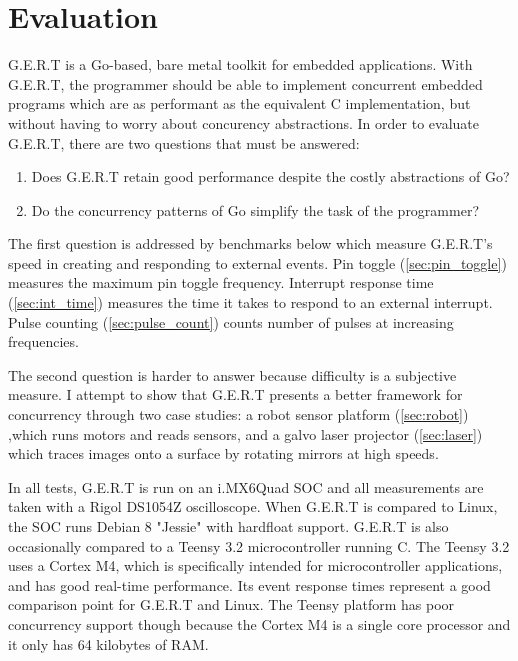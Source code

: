 \chapter{Evaluation}

G.E.R.T is a Go-based, bare metal toolkit for embedded applications.
With G.E.R.T, the programmer should be able to implement concurrent embedded programs
which are as performant as the equivalent C implementation, but without having to
worry about concurency abstractions. In order to evaluate G.E.R.T, there are two questions
that must be answered:

\begin{enumerate}
  \item Does G.E.R.T retain good performance despite the costly abstractions of Go?
  \item Do the concurrency patterns of Go simplify the task of the programmer?
\end{enumerate}

The first question is addressed by benchmarks below which measure G.E.R.T's
speed in creating and responding to external events. Pin toggle (\ref{sec:pin_toggle})
measures the maximum pin toggle frequency. Interrupt response time (\ref{sec:int_time})
measures the time it takes to respond to an external interrupt. Pulse counting
(\ref{sec:pulse_count}) counts number of pulses at increasing frequencies.

The second question is harder to answer because difficulty is a subjective
measure. I attempt to show that G.E.R.T presents a better framework for
concurrency through two case studies: a robot sensor platform (\ref{sec:robot})
,which runs motors and reads sensors, and a galvo laser projector (\ref{sec:laser})
which traces images onto a surface by rotating mirrors at high speeds.

In all tests, G.E.R.T is run on an i.MX6Quad SOC and all measurements are taken
with a Rigol DS1054Z oscilloscope. When G.E.R.T is compared to Linux, the SOC
runs Debian 8 "Jessie" with hardfloat support. G.E.R.T is also occasionally
compared to a Teensy 3.2 microcontroller running C. The Teensy 3.2 uses a Cortex M4, which is specifically
intended for microcontroller applications, and has good real-time performance. Its event
response times represent a good comparison point for G.E.R.T and Linux. The Teensy platform
has poor concurrency support though because the Cortex M4 is a single core processor
and it only has 64 kilobytes of RAM.


